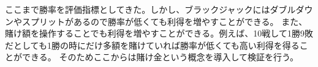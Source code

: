 ここまで勝率を評価指標としてきた。しかし、ブラックジャックにはダブルダウンやスプリットがあるので勝率が低くても利得を増やすことができる。
また、賭け額を操作することでも利得を増やすことができる。例えば、10戦して1勝9敗だとしても1勝の時にだけ多額を賭けていれば勝率が低くても高い利得を得ることができる。
そのためここからは賭け金という概念を導入して検証を行う。
